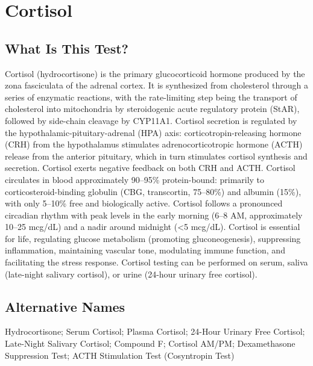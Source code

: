 \chapter{Cortisol}

\section*{What Is This Test?}
Cortisol (hydrocortisone) is the primary glucocorticoid hormone produced by the zona fasciculata of the adrenal cortex. It is synthesized from cholesterol through a series of enzymatic reactions, with the rate-limiting step being the transport of cholesterol into mitochondria by steroidogenic acute regulatory protein (StAR), followed by side-chain cleavage by CYP11A1. Cortisol secretion is regulated by the hypothalamic-pituitary-adrenal (HPA) axis: corticotropin-releasing hormone (CRH) from the hypothalamus stimulates adrenocorticotropic hormone (ACTH) release from the anterior pituitary, which in turn stimulates cortisol synthesis and secretion. Cortisol exerts negative feedback on both CRH and ACTH. Cortisol circulates in blood approximately 90--95\% protein-bound: primarily to corticosteroid-binding globulin (CBG, transcortin, 75--80\%) and albumin (15\%), with only 5--10\% free and biologically active. Cortisol follows a pronounced circadian rhythm with peak levels in the early morning (6--8 AM, approximately 10--25 mcg/dL) and a nadir around midnight (<5 mcg/dL). Cortisol is essential for life, regulating glucose metabolism (promoting gluconeogenesis), suppressing inflammation, maintaining vascular tone, modulating immune function, and facilitating the stress response. Cortisol testing can be performed on serum, saliva (late-night salivary cortisol), or urine (24-hour urinary free cortisol).

\section*{Alternative Names}
Hydrocortisone; Serum Cortisol; Plasma Cortisol; 24-Hour Urinary Free Cortisol; Late-Night Salivary Cortisol; Compound F; Cortisol AM/PM; Dexamethasone Suppression Test; ACTH Stimulation Test (Cosyntropin Test)


